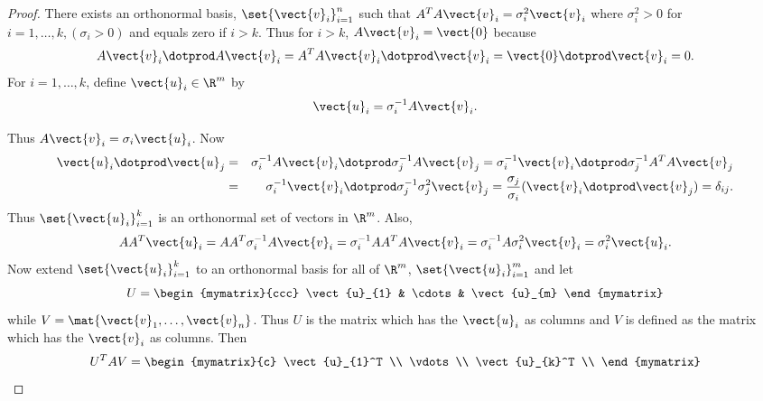 \begin{proof}
There exists an orthonormal basis, $\set{\vect{v}_{i}} _{i=1}^{n}$ such that $
A^TA\vect{v}_{i}=\sigma _{i}^{2}\vect{v}_{i}$ where $\sigma
_{i}^{2}>0$ for $i=1,\ldots,k,(\sigma _{i}>0) $ and equals zero
if $i>k$. Thus for $i>k$, $A\vect{v}_{i}=\vect{0}$ because
\begin{equation*}
 A\vect{v}_{i}\dotprod A\vect{v}_{i} = A^TA\vect{v}_{i} \dotprod \vect{v}_{i}  = \vect{0} \dotprod \vect{v}_{i} =0.
\end{equation*}
For $i=1,\ldots,k$, define $\vect{u}_{i}\in \R^{m}$ by
\begin{equation*}
\vect{u}_{i}= \sigma _{i}^{-1}A\vect{v}_{i}.
\end{equation*}

Thus $A\vect{v}_{i}=\sigma _{i}\vect{u}_{i}$. Now
\begin{eqnarray*}
\vect{u}_{i} \dotprod \vect{u}_{j} &=&  \sigma _{i}^{-1}A
\vect{v}_{i} \dotprod \sigma _{j}^{-1}A\vect{v}_{j}  = \sigma_{i}^{-1}\vect{v}_{i} \dotprod \sigma _{j}^{-1}A^TA\vect{v}_{j} \\
&=& \sigma _{i}^{-1}\vect{v}_{i} \dotprod \sigma _{j}^{-1}\sigma _{j}^{2} \vect{v}_{j} =
\frac{\sigma _{j}}{\sigma _{i}}(\vect{v}_{i} \dotprod \vect{v}_{j})
=\delta _{ij}.
\end{eqnarray*}
Thus $\set{\vect{u}_{i}} _{i=1}^{k}$ is an orthonormal set of
vectors in $\R^{m}$. Also,
\begin{equation*}
AA^T\vect{u}_{i}=AA^T\sigma _{i}^{-1}A\vect{v}_{i}=\sigma
_{i}^{-1}AA^TA\vect{v}_{i}=\sigma _{i}^{-1}A\sigma _{i}^{2}\vect{v}
_{i}=\sigma _{i}^{2}\vect{u}_{i}.
\end{equation*}
Now extend $\set{\vect{u}_{i}} _{i=1}^{k}$ to an orthonormal
basis for all of $\R^{m}$, $\set{\vect{u}_{i}} _{i=1}^{m}$
and let
\begin{equation*}
U= \begin{mymatrix}{ccc}
\vect{u}_{1} & \cdots & \vect{u}_{m}
\end{mymatrix}
\end{equation*}
while $V= \mat{\vect{v}_{1},\ldots,\vect{v}_{n}}$. Thus $U$
is the matrix which has the $\vect{u}_{i}$ as columns and $V$ is defined
as the matrix which has the $\vect{v}_{i}$ as columns. Then
\begin{equation*}
U^TAV=\begin{mymatrix}{c}
\vect{u}_{1}^T \\
\vdots \\
\vect{u}_{k}^T \\

\end{mymatrix}
\end{equation*}
\end{proof}
